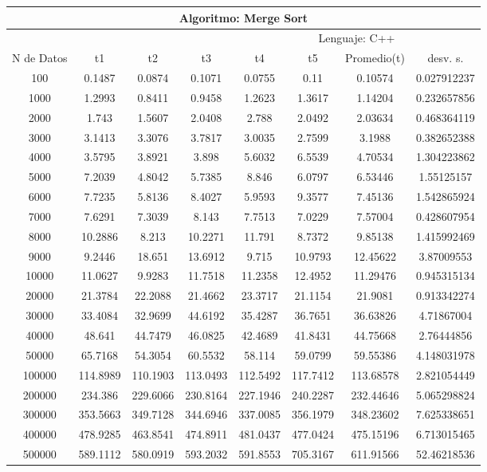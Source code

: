 \documentclass{article}
\begin{document}
    \begin{table}[]
        \begin{tabular}{|c|c|c|c|c|c|c|c| }
            \hline
            \multicolumn{8}{|c|}{Algoritmo: Merge Sort} \\ \hline
            \multicolumn{4}{|c|}{} & \multicolumn{4}{c|}{Lenguaje: C++} \\ \hline
              N de Datos &     t1    &  t2         &  t3          &   t4        &    t5     &   Promedio(t)       & desv. s. \\ \hline
100	    &0.1487	&0.0874	&0.1071	&0.0755	&0.11	&0.10574	&0.027912237\\ \hline
1000	&1.2993	&0.8411	&0.9458	&1.2623	&1.3617	&1.14204	&0.232657856\\ \hline
2000	&1.743	&1.5607	&2.0408	&2.788	&2.0492	&2.03634	&0.468364119\\ \hline
3000	&3.1413	&3.3076	&3.7817	&3.0035	&2.7599	&3.1988	&0.382652388\\ \hline
4000	&3.5795	&3.8921	&3.898	&5.6032	&6.5539	&4.70534	&1.304223862\\ \hline
5000	&7.2039	&4.8042	&5.7385	&8.846	&6.0797	&6.53446	&1.55125157\\ \hline
6000	&7.7235	&5.8136	&8.4027	&5.9593	&9.3577	&7.45136	&1.542865924\\ \hline
7000	&7.6291	&7.3039	&8.143	&7.7513	&7.0229	&7.57004	&0.428607954\\ \hline
8000	&10.2886	&8.213	&10.2271	&11.791	&8.7372	&9.85138	&1.415992469\\ \hline
9000	&9.2446	&18.651	&13.6912	&9.715	&10.9793	&12.45622	&3.87009553\\ \hline
10000	&11.0627	&9.9283	&11.7518	&11.2358	&12.4952	&11.29476	&0.945315134\\ \hline
20000	&21.3784	&22.2088	&21.4662	&23.3717	&21.1154	&21.9081	&0.913342274\\ \hline
30000	&33.4084	&32.9699	&44.6192	&35.4287	&36.7651	&36.63826	&4.71867004\\ \hline
40000	&48.641	&44.7479	&46.0825	&42.4689	&41.8431	&44.75668	&2.76444856\\ \hline
50000	&65.7168	&54.3054	&60.5532	&58.114	&59.0799	&59.55386	&4.148031978\\ \hline
100000	&114.8989	&110.1903	&113.0493	&112.5492	&117.7412	&113.68578	&2.821054449\\ \hline
200000	&234.386	    & 229.6066	&230.8164	&227.1946	&240.2287	&232.44646	&5.065298824\\ \hline
300000	&353.5663	&349.7128	&344.6946	&337.0085	&356.1979	&348.23602	&7.625338651\\ \hline
400000	&478.9285	&463.8541	&474.8911	&481.0437	&477.0424	&475.15196	&6.713015465\\ \hline
500000	&589.1112	&580.0919	&593.2032	&591.8553	&705.3167	&611.91566	&52.46218536\\ \hline
        \end{tabular}
    \end{table} 
    
\end{document}
